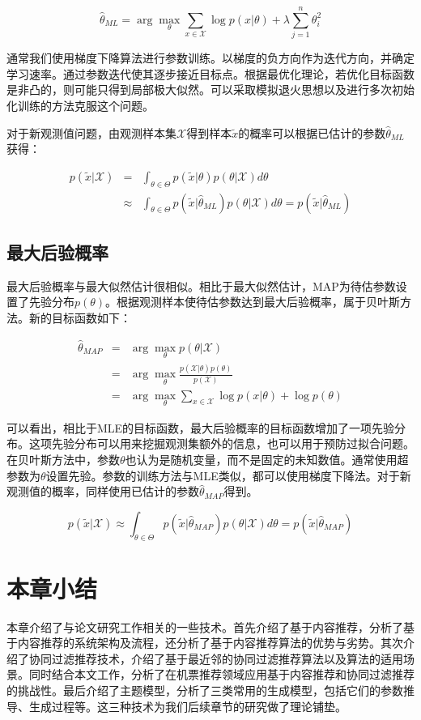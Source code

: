 \begin{equation}
	\hat{\theta}_{ML} = \arg\max_\theta \sum_{x \in \mathcal{X}}\log p(x|\theta) + \lambda\sum_{j=1}^n\theta_i^2
\end{equation}

通常我们使用梯度下降算法进行参数训练。以梯度的负方向作为迭代方向，并确定学习速率。通过参数迭代使其逐步接近目标点。根据最优化理论，若优化目标函数是非凸的，则可能只得到局部极大似然。可以采取模拟退火思想以及进行多次初始化训练的方法克服这个问题。

对于新观测值问题，由观测样本集$\mathcal{X}$得到样本$\tilde{x}$的概率可以根据已估计的参数$\hat{\theta}_{ML}$获得：

\begin{eqnarray}
p(\tilde{x}|\mathcal{X})& = &\int_{\theta \in \Theta}p(\tilde{x}|\theta)p(\theta|\mathcal{X})d\theta \nonumber \\
& \approx &\int_{\theta \in \Theta}p(\tilde{x}|\hat{\theta}_{ML})p(\theta|\mathcal{X})d\theta = p(\tilde{x}|\hat{\theta}_{ML})
\end{eqnarray}


\subsection{最大后验概率}

最大后验概率与最大似然估计很相似。相比于最大似然估计，MAP为待估参数设置了先验分布$p(\theta)$。根据观测样本使待估参数达到最大后验概率，属于贝叶斯方法。新的目标函数如下：

\begin{eqnarray}
	\hat{\theta}_{MAP} &=& \arg\max_\theta p(\theta|\mathcal{X}) \nonumber \\
	&=& \arg\max_\theta \frac{p(\mathcal{X}|\theta)p(\theta)}{p(\mathcal{X})} \nonumber \\
	&=& \arg\max_\theta {\sum_{x \in \mathcal{X}}\log p(x|\theta) + \log p(\theta)}
\end{eqnarray}

可以看出，相比于MLE的目标函数，最大后验概率的目标函数增加了一项先验分布。这项先验分布可以用来挖掘观测集额外的信息，也可以用于预防过拟合问题。在贝叶斯方法中，参数$\theta$也认为是随机变量，而不是固定的未知数值。通常使用超参数为$\theta$设置先验。参数的训练方法与MLE类似，都可以使用梯度下降法。对于新观测值的概率，同样使用已估计的参数$\hat{\theta}_{MAP}$得到。

\begin{equation}
p(\tilde{x}|\mathcal{X}) \approx \int_{\theta \in \Theta}p(\tilde{x}|\hat{\theta}_{MAP})p(\theta|\mathcal{X})d\theta = p(\tilde{x}|\hat{\theta}_{MAP})
\end{equation}
\fi

\section{本章小结}
本章介绍了与论文研究工作相关的一些技术。首先介绍了基于内容推荐，分析了基于内容推荐的系统架构及流程，还分析了基于内容推荐算法的优势与劣势。其次介绍了协同过滤推荐技术，介绍了基于最近邻的协同过滤推荐算法以及算法的适用场景。同时结合本文工作，分析了在机票推荐领域应用基于内容推荐和协同过滤推荐的挑战性。最后介绍了主题模型，分析了三类常用的生成模型，包括它们的参数推导、生成过程等。这三种技术为我们后续章节的研究做了理论铺垫。









